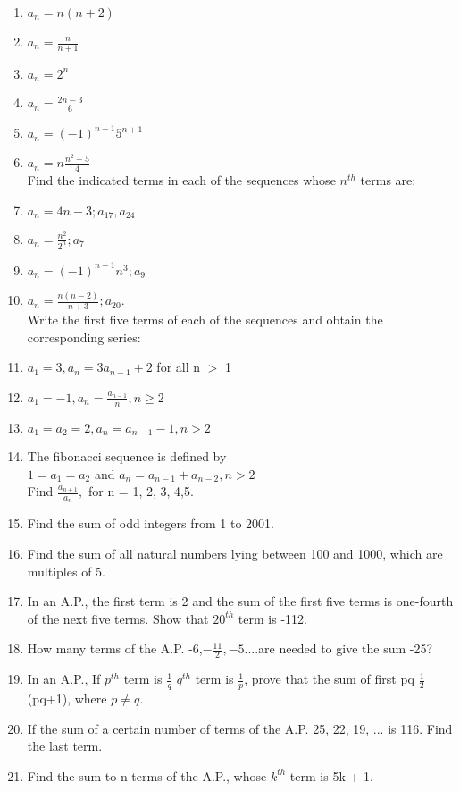 \renewcommand{\theequation}{\theenumi}
\begin{enumerate}[label=\arabic*.,ref=\thesubsection.\theenumi]
\item $a_n = n(n+2)$
\item $a_n = \frac{n}{n+1}$
\item $a_n = 2^n$
\item $a_n = \frac{2n-3}{6}$
\item $a_n = (-1)^{n-1}5^{n+1}$
\item $a_n = n\frac{n^2+5}{4}$ \\
Find the indicated terms in each of the sequences whose $n^{th}$ terms are:
\item $a_n = 4n-3; a_{17}, a_{24}$
\item $a_n = \frac{n^2}{2^n};a_7$
\item $a_n = (-1)^{n-1}n^3;a_9$
\item $a_n = \frac{n(n-2)}{n+3};a_{20}.$\\
Write the first five terms of each of the sequences and obtain the
corresponding series:
\item $a_1 = 3, a_n = 3a_{n-1}+2$ for all n $>$ 1
\item $a_1 = -1, a_n = \frac{a_{n-1}}{n}, n \geq 2$
\item $a_1 = a_2 = 2, a_n = a_{n-1}-1,n > 2$ 
\item The fibonacci sequence is defined by \\$1 = a_1 = a_2$ and $a_n = a_{n-1}+a_{n-2},n>2 $\\
Find $\frac{a_{n+1}}{a_n},$ for n = 1, 2, 3, 4,5.
\item Find the sum of odd integers from 1 to 2001.
\item Find the sum of all natural numbers lying between 100 and 1000, which are multiples of 5.
\item In an A.P., the first term is 2 and the sum of the first five terms is one-fourth of the next five terms. Show that $20^{th}$ term is -112.
\item How many terms of the A.P. -6,$-\frac{11}{2}, -5$....are needed to give the sum -25?
\item In an A.P., If $p^{th}$ term is $\frac{1}{q}$ $q^{th}$ term is $\frac{1}{p}$, prove that the sum of first pq $\frac{1}{2}$(pq+1), where $p \neq q.$
\item  If the sum of a certain number of terms of the A.P. 25, 22, 19, ... is 116. Find the last term.
\item Find the sum to n terms of the A.P., whose $k^{th}$ term is 5k + 1.

\end{enumerate}
